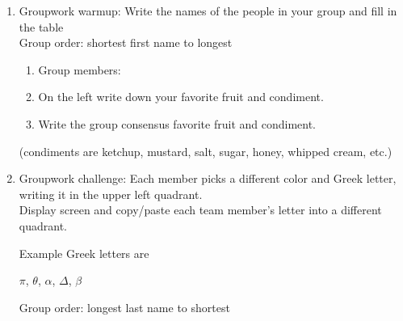 \documentclass[12pt, twoside]{article}
\begin{document}
\begin{enumerate}
\newpage
\item Groupwork warmup: Write the names of the people in your group and fill in the table\\[0.25cm]
Group order: shortest first name to longest
\begin{multicols}{2}  
  \begin{enumerate}
    \item Group members:
    \item On the left write down your favorite fruit and condiment.
    \item Write the group consensus favorite fruit and condiment.
    \end{enumerate}
\end{multicols}
(condiments are ketchup, mustard, salt, sugar, honey, whipped cream, etc.)

\newpage
\item Groupwork challenge: Each member picks a different color and Greek letter, writing it in the upper left quadrant.\\[0.25cm]
Display screen and copy/paste each team member's letter into a different quadrant.
\begin{center}
\end{center}
Example Greek letters are 
{\Large$\pi$, $\theta$, $\alpha$, $\Delta$, $\beta$ \par}
Group order: longest last name to shortest


\end{enumerate}
\end{document}
